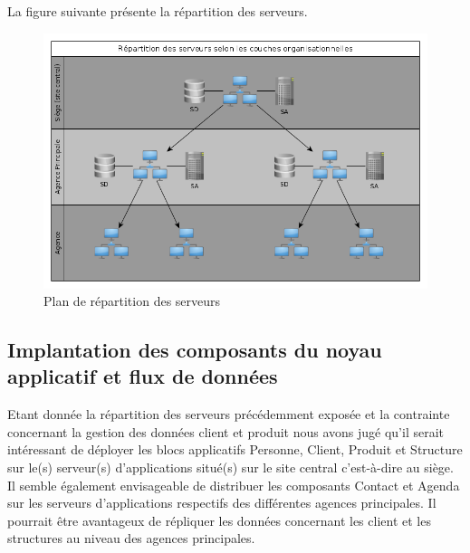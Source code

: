 La figure suivante présente la répartition des serveurs.

\begin{figure}[H]
    \centering
    \includegraphics[scale=0.5]{figures/architectureServeurs.png}
    \caption{Plan de répartition des serveurs}
\end{figure}

\subsection{Implantation des composants du noyau applicatif et flux de données}

Etant donnée la répartition des serveurs précédemment exposée et la contrainte concernant la gestion des données client et produit nous avons jugé qu'il serait intéressant de déployer les blocs applicatifs Personne, Client, Produit et Structure sur le(s) serveur(s) d'applications situé(s) sur le site central c'est-à-dire au siège. Il semble également envisageable de distribuer les composants Contact et Agenda sur les serveurs d'applications respectifs des différentes agences principales. Il pourrait être avantageux de répliquer les données concernant les client et les structures au niveau des agences principales. \\

